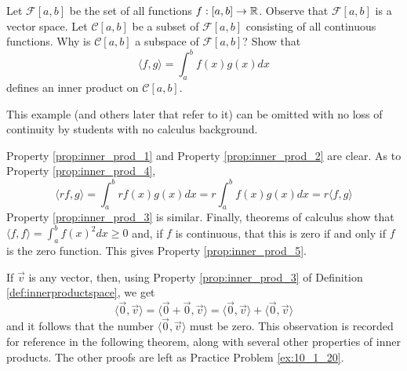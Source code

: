 \documentclass{ximera}
\begin{document}
\begin{example}\label{exa:030334}
Let $\mathcal{F}[a,b]$ be the set of all functions $f:[a,b]\rightarrow\mathbb{R}$.  Observe that $\mathcal{F}[a,b]$ is a vector space.  Let $\mathcal{C}[a,b]$ be a subset of $\mathcal{F}[a,b]$ consisting of all continuous functions.  Why is $\mathcal{C}[a,b]$ a subspace of $\mathcal{F}[a,b]$?
Show that
\begin{equation*}
\langle f, g \rangle = \int_{a}^{b} f(x)g(x)dx
\end{equation*}
defines an inner product on $\mathcal{C}[a, b]$.

\begin{remark}
    This example (and others later that refer to it) can be omitted with no loss of continuity by students with no calculus background.
\end{remark}

\begin{explanation}
 Property \ref{prop:inner_prod_1} and Property \ref{prop:inner_prod_2} are clear. As to  Property \ref{prop:inner_prod_4},
\begin{equation*}
\langle rf, g \rangle = \int_{a}^{b} rf(x)g(x)dx = r\int_{a}^{b} f(x)g(x)dx =
r\langle f, g \rangle
\end{equation*}
 Property \ref{prop:inner_prod_3} is similar. Finally, theorems of calculus show that $\langle f, f \rangle = \int_{a}^{b} f(x)^2dx \geq 0$ and, if $f$ is continuous, that this is zero if and only if $f$ is the zero function. This gives  Property \ref{prop:inner_prod_5}.
\end{explanation}
\end{example}


If $\vec{v}$ is any vector, then, using  Property \ref{prop:inner_prod_3} of Definition \ref{def:innerproductspace}, we get
\begin{equation*}
\langle \vec{0}, \vec{v} \rangle = \langle \vec{0} + \vec{0}, \vec{v} \rangle =
\langle \vec{0}, \vec{v} \rangle + \langle \vec{0}, \vec{v} \rangle
\end{equation*}
and it follows that the number $\langle\vec{0}, \vec{v}\rangle$ must be zero. This observation is recorded for reference in the following theorem, along with several other properties of inner products. The other proofs are left as Practice Problem \ref{ex:10_1_20}.
\end{document}
